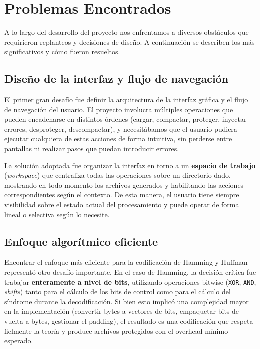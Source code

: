 \chapter*{Problemas Encontrados}

A lo largo del desarrollo del proyecto nos enfrentamos a diversos obstáculos que requirieron replanteos y decisiones de diseño. A continuación se describen los más significativos y cómo fueron resueltos.

\section*{Diseño de la interfaz y flujo de navegación}

El primer gran desafío fue definir la arquitectura de la interfaz gráfica y el flujo de navegación del usuario. El proyecto involucra múltiples operaciones que pueden encadenarse en distintos órdenes (cargar, compactar, proteger, inyectar errores, desproteger, descompactar), y necesitábamos que el usuario pudiera ejecutar cualquiera de estas acciones de forma intuitiva, sin perderse entre pantallas ni realizar pasos que puedan introducir errores.

La solución adoptada fue organizar la interfaz en torno a un \textbf{espacio de trabajo} (\textit{workspace}) que centraliza todas las operaciones sobre un directorio dado, mostrando en todo momento los archivos generados y habilitando las acciones correspondientes según el contexto. De esta manera, el usuario tiene siempre visibilidad sobre el estado actual del procesamiento y puede operar de forma lineal o selectiva según lo necesite.

\section*{Enfoque algorítmico eficiente}

Encontrar el enfoque más eficiente para la codificación de Hamming y Huffman representó otro desafío importante. En el caso de Hamming, la decisión crítica fue trabajar \textbf{enteramente a nivel de bits}, utilizando operaciones bitwise (\texttt{XOR}, \texttt{AND}, \textit{shifts}) tanto para el cálculo de los bits de control como para el cálculo del síndrome durante la decodificación. Si bien esto implicó una complejidad mayor en la implementación (convertir bytes a vectores de bits, empaquetar bits de vuelta a bytes, gestionar el padding), el resultado es una codificación que respeta fielmente la teoría y produce archivos protegidos con el overhead mínimo esperado.

